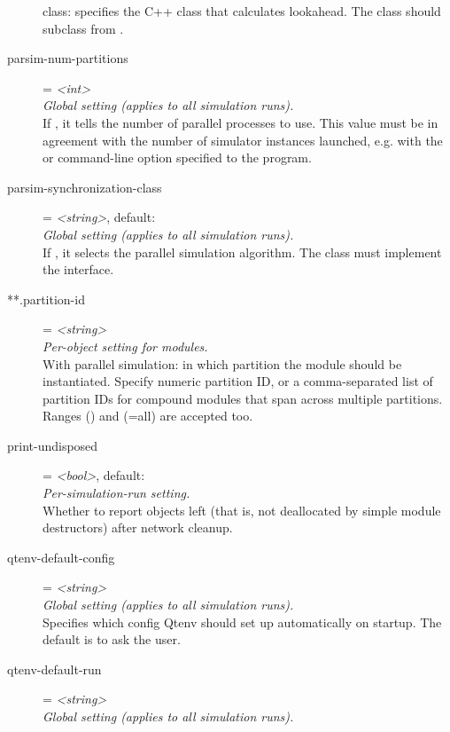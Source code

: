 \begin{description}
    class: specifies the C++ class that calculates lookahead. The class should
    subclass from .
\item[parsim-num-partitions] = \textit{<int>}\\
    \textit{Global setting (applies to all simulation runs).}\\
    If , it tells the
    number of parallel processes to use. This value must be in agreement with
    the number of simulator instances launched, e.g. with the
     or  command-line option
    specified to the  program.
\item[parsim-synchronization-class] = \textit{<string>}, default: \\
    \textit{Global setting (applies to all simulation runs).}\\
    If , it selects the
    parallel simulation algorithm. The class must implement the
     interface.
\item[**.partition-id] = \textit{<string>}\\
    \textit{Per-object setting for modules.}\\
    With parallel simulation: in which partition the module should be
    instantiated. Specify numeric partition ID, or a comma-separated list of
    partition IDs for compound modules that span across multiple partitions.
    Ranges () and \ttt{*} (=all) are accepted too.
\item[print-undisposed] = \textit{<bool>}, default: \\
    \textit{Per-simulation-run setting.}\\
    Whether to report objects left (that is, not deallocated by simple module
    destructors) after network cleanup.
\item[qtenv-default-config] = \textit{<string>}\\
    \textit{Global setting (applies to all simulation runs).}\\
    Specifies which config Qtenv should set up automatically on startup. The
    default is to ask the user.
\item[qtenv-default-run] = \textit{<string>}\\
    \textit{Global setting (applies to all simulation runs).}\\

\end{description}
